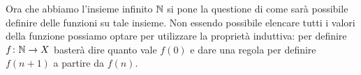   
Ora che abbiamo l'insieme infinito ${\mathbb N}$ si pone la questione di come sarà possibile definire
delle funzioni su tale insieme. 
Non essendo possibile elencare tutti i valori della funzione possiamo optare 
per utilizzare la proprietà induttiva: per definire $f\colon {\mathbb N} \to X$ 
basterà dire quanto vale $f(0)$ e dare una regola per definire $f(n+1)$ a partire da $f(n)$.

